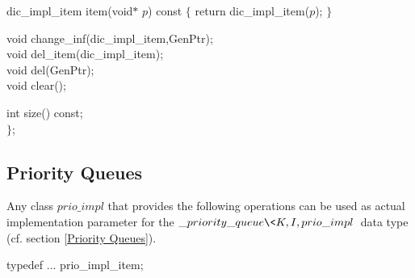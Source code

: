 \hspace*{.5cm}dic\_impl\_item item(void$*$ $p$) const $\{$ return dic\_impl\_item($p$); $\}$

\hspace*{.5cm}void change\_inf(dic\_impl\_item,GenPtr);\\
\hspace*{.5cm}void del\_item(dic\_impl\_item);\\
\hspace*{.5cm}void del(GenPtr);\\
\hspace*{.5cm}void clear();

\hspace*{.5cm}int size() const;\\
$\}$;

\newpage

\subsection{Priority Queues}

\label{User Implementations Priority Queues}

Any class $prio\_impl$ that provides the following operations can be used as 
actual implementation parameter for the $\_priority\_queue\<K,I,prio\_impl\>$
data type (cf. section \ref{Priority Queues}).

typedef ... prio\_impl\_item;

